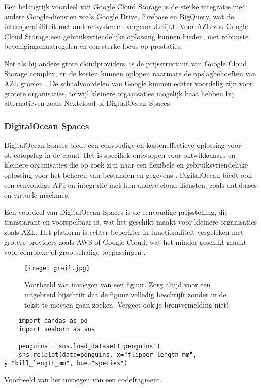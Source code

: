 Een belangrijk voordeel van Google Cloud Storage is de sterke integratie met andere Google-diensten zoals Google Drive, Firebase en BigQuery, wat de interoperabiliteit met andere systemen vergemakkelijkt. Voor AZL zou Google Cloud Storage een gebruiksvriendelijke oplossing kunnen bieden, met robuuste beveiligingsmaatregelen en een sterke focus op prestaties.

Net als bij andere grote cloudproviders, is de prijsstructuur van Google Cloud Storage complex, en de kosten kunnen oplopen naarmate de opslagbehoeften van AZL groeien \autocite{google_pricing}. De schaalvoordelen van Google kunnen echter voordelig zijn voor grotere organisaties, terwijl kleinere organisaties mogelijk baat hebben bij alternatieven zoals Nextcloud of DigitalOcean Spaces.

\subsubsection{DigitalOcean Spaces}
DigitalOcean Spaces biedt een eenvoudige en kosteneffectieve oplossing voor objectopslag in de cloud. Het is specifiek ontworpen voor ontwikkelaars en kleinere organisaties die op zoek zijn naar een flexibele en gebruiksvriendelijke oplossing voor het beheren van bestanden en gegevens \autocite{digitalocean_spaces}. DigitalOcean biedt ook een eenvoudige API en integratie met hun andere cloud-diensten, zoals databases en virtuele machines.

Een voordeel van DigitalOcean Spaces is de eenvoudige prijsstelling, die transparant en voorspelbaar is, wat het geschikt maakt voor kleinere organisaties zoals AZL. Het platform is echter beperkter in functionaliteit vergeleken met grotere providers zoals AWS of Google Cloud, wat het minder geschikt maakt voor complexe of grootschalige toepassingen \autocite{digitalocean_pricing}.



\begin{figure}
  \centering
  \texttt{[image: grail.jpg]}
  \caption[Voorbeeld figuur.]{\label{fig:grail}Voorbeeld van invoegen van een figuur. Zorg altijd voor een uitgebreid bijschrift dat de figuur volledig beschrijft zonder in de tekst te moeten gaan zoeken. Vergeet ook je bronvermelding niet!}
\end{figure}

\begin{listing}
  \begin{verbatim}
    import pandas as pd
    import seaborn as sns

    penguins = sns.load_dataset('penguins')
    sns.relplot(data=penguins, x="flipper_length_mm", y="bill_length_mm", hue="species")
  \end{verbatim}
  \caption[Voorbeeld codefragment]{Voorbeeld van het invoegen van een codefragment.}
\end{listing}

\lipsum[7-20]



